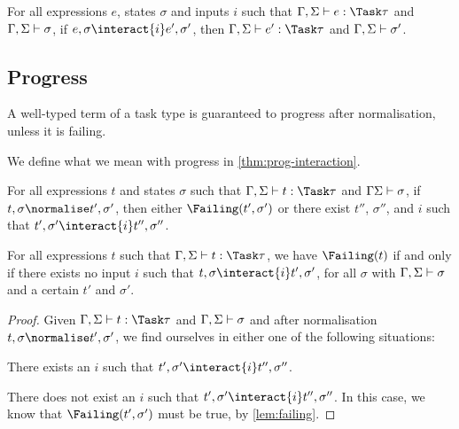 \begin{theorem}
  For all expressions $e$, states $\sigma$ and inputs $i$
  such that $\Gamma,\Sigma \infers e:\Task\tau$ and $\Gamma,\Sigma \vdash \sigma$,
  if $ e,\sigma \interact{i} e',\sigma'$,
  then $\Gamma,\Sigma\infers e':\Task\tau$ and $\Gamma,\Sigma\vdash \sigma'$.
  \label{thm:pres-interaction}
\end{theorem}

\subsection{Progress}

A well-typed term of a task type is guaranteed to progress after normalisation,
unless it is failing.

We define what we mean with progress in \cref{thm:prog-interaction}.
\begin{theorem}
  For all expressions $t$ and states $\sigma$
  such that $\Gamma,\Sigma \infers t:\Task\tau$ and $\Gamma\Sigma \vdash \sigma$,
  if $t,\sigma \normalise t',\sigma'$,
  then either $\Failing(t', \sigma')$
  or there exist $t''$, $\sigma''$, and $i$ such that $t',\sigma'\interact{i} t'',\sigma''$.
  \label{thm:prog-interaction}
\end{theorem}



\begin{lemma}
  For all expressions $t$
  such that $\Gamma,\Sigma\infers t:\Task\tau$,
  we have $\Failing(t)$ if and only if there exists no input $i$ such that $t,\sigma\interact{i} t',\sigma'$, for all $\sigma$ with $\Gamma,\Sigma\vdash\sigma$ and a certain $t'$ and $\sigma'$.
  \label{lem:failing}
\end{lemma}


\begin{proof}
  Given $\Gamma,\Sigma\infers t:\Task\tau$ and $\Gamma,\Sigma\vdash\sigma$ and after normalisation $t,\sigma\normalise t',\sigma'$, we find ourselves in either one of the following situations:

  There exists an $i$ such that $t',\sigma'\interact{i} t'',\sigma''$.

  There does not exist an $i$ such that $t',\sigma'\interact{i} t'',\sigma''$. In this case, we
  know that $\Failing(t',\sigma')$ must be true, by \cref{lem:failing}.

\end{proof}

